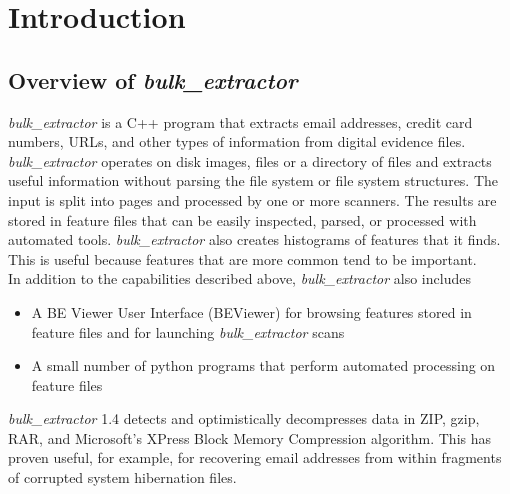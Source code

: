 \documentclass[11pt,fleqn]{article} %
\begin{document}
\newcommand \bulk {\textit{bulk\_extractor}\xspace}
\newcommand \beapi {\textit{be13\_api}\xspace}
\newcommand \mytitle {\emph{bulk\_extractor 1.4}}






\setlength{\parindent}{0pt} %
\newpage
\tableofcontents
\newpage
{}



\section{Introduction}

\subsection{Overview of \bulk}

\bulk is a C++ program that extracts email addresses, credit card numbers, URLs, and other types of information from digital evidence files. \bulk operates on disk images, files or a directory of files and extracts useful information without parsing the file system or file system structures. The input is split into pages and processed by one or more scanners. The results are stored in feature files that can be easily inspected, parsed, or processed with automated tools. \bulk also creates histograms of features that it finds. This is useful because features that are more common tend to be important. \\  

In addition to the capabilities described above, \bulk also includes 
\begin{itemize}	
	\item A BE Viewer User Interface (BEViewer) for browsing features stored in feature files and for launching \bulk scans
	\item A small number of python programs that perform automated processing on feature files
\end{itemize} 
\bulk 1.4 detects and optimistically decompresses data in ZIP, gzip, RAR, and Microsoft's XPress Block Memory Compression algorithm. This has proven useful, for example, for recovering email addresses from within fragments of corrupted system hibernation files. \\
\end{document}
